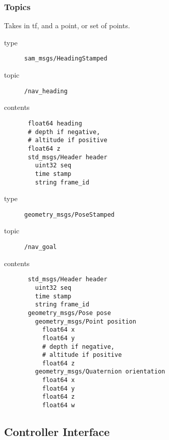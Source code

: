 \documentclass[9pt,technote]{IEEEtran} %
\begin{document}
\subsubsection{Topics}


Takes in tf, and a point, or set of points.

\begin{description}
\item[type] \texttt{sam\_msgs/HeadingStamped}
\item[topic] \texttt{/nav\_heading}
\item[contents] \begin{scriptsize}
\begin{verbatim}
 float64 heading
 # depth if negative,
 # altitude if positive
 float64 z
 std_msgs/Header header
   uint32 seq
   time stamp
   string frame_id
\end{verbatim}
\end{scriptsize}
\end{description}

\begin{description}
\item[type] \texttt{geometry\_msgs/PoseStamped}
\item[topic] \texttt{/nav\_goal}
\item[contents] \begin{scriptsize}
\begin{verbatim}
 std_msgs/Header header
   uint32 seq
   time stamp
   string frame_id
 geometry_msgs/Pose pose
   geometry_msgs/Point position
     float64 x
     float64 y
     # depth if negative,
     # altitude if positive
     float64 z 
   geometry_msgs/Quaternion orientation
     float64 x
     float64 y
     float64 z
     float64 w
\end{verbatim}
\end{scriptsize}
\end{description}


\subsection{Controller Interface}
\label{controller}
\end{document}
